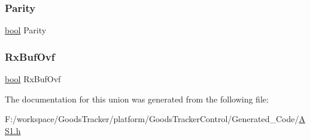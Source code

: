\mbox{\label{union_a_s1___t_error_a99fd786f4086e50e917c12b226fc82af}} 
\subsubsection{\texorpdfstring{Parity}{Parity}}
{\footnotesize\ttfamily \hyperlink{group___p_e___types__module_ga97a80ca1602ebf2303258971a2c938e2}{bool} Parity}

\mbox{\label{union_a_s1___t_error_aed37d6601dc7121b167ee47354444421}} 
\subsubsection{\texorpdfstring{Rx\+Buf\+Ovf}{RxBufOvf}}
{\footnotesize\ttfamily \hyperlink{group___p_e___types__module_ga97a80ca1602ebf2303258971a2c938e2}{bool} Rx\+Buf\+Ovf}



The documentation for this union was generated from the following file\+:\begin{DoxyCompactItemize}
\item 
F\+:/workspace/\+Goods\+Tracker/platform/\+Goods\+Tracker\+Control/\+Generated\+\_\+\+Code/\hyperlink{_a_s1_8h}{A\+S1.\+h}\end{DoxyCompactItemize}
